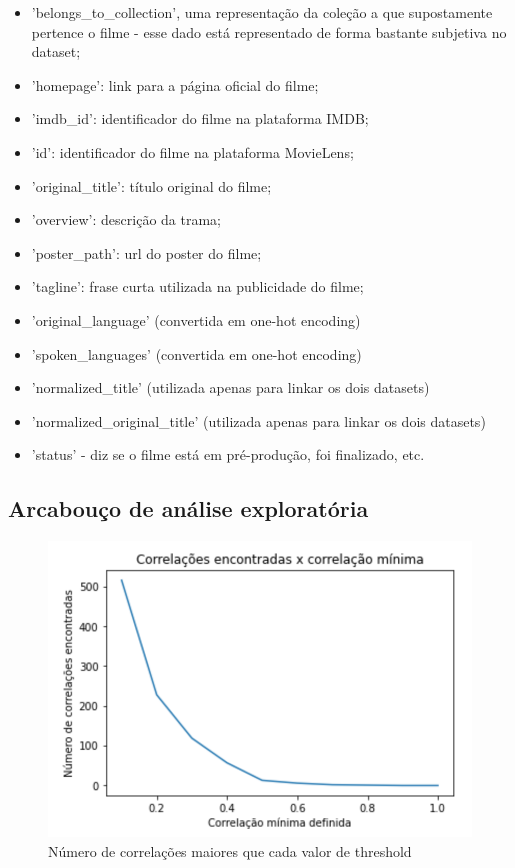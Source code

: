         \begin{itemize}
            \item 'belongs\_to\_collection', uma representação da coleção a que supostamente pertence o filme - esse dado está representado de forma bastante subjetiva no dataset;
            \item 'homepage': link para a página oficial do filme;
            \item 'imdb\_id': identificador do filme na plataforma IMDB;
            \item 'id': identificador do filme na plataforma MovieLens;
            \item 'original\_title': título original do filme;
            \item 'overview': descrição da trama;
            \item 'poster\_path': url do poster do filme;
            \item 'tagline': frase curta utilizada na publicidade do filme;
            \item 'original\_language' (convertida em one-hot encoding)
            \item 'spoken\_languages' (convertida em one-hot encoding)
            \item 'normalized\_title' (utilizada apenas para linkar os dois datasets)
            \item 'normalized\_original\_title' (utilizada apenas para linkar os dois datasets)
            \item 'status' - diz se o filme está em pré-produção, foi finalizado, etc.
        \end{itemize}

        \subsection{Arcabouço de análise exploratória}\par

        \begin{figure}[htb]
        	\caption{\label{corrs_graph}Número de correlações maiores que cada valor de threshold}
        	\begin{center}
        		\includegraphics[scale=0.8]{corrs_graph.png}
        	\end{center}
        \end{figure}


